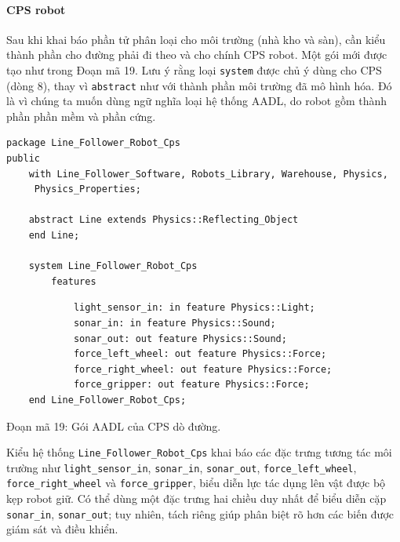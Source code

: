 \paragraph*{CPS robot}
Sau khi khai báo phần tử phân loại cho môi trường (nhà kho và sàn), cần kiểu thành phần cho đường phải đi theo và cho chính CPS robot. Một gói mới được tạo như trong Đoạn mã 19. Lưu ý rằng loại \texttt{system} được chủ ý dùng cho CPS (dòng 8), thay vì \texttt{abstract} như với thành phần môi trường đã mô hình hóa. Đó là vì chúng ta muốn dùng ngữ nghĩa loại hệ thống AADL, do robot gồm thành phần phần mềm và phần cứng.
\begin{verbatim}
package Line_Follower_Robot_Cps
public
    with Line_Follower_Software, Robots_Library, Warehouse, Physics,
     Physics_Properties;

    abstract Line extends Physics::Reflecting_Object
    end Line;

    system Line_Follower_Robot_Cps
        features
\end{verbatim}

\begin{verbatim}
            light_sensor_in: in feature Physics::Light;
            sonar_in: in feature Physics::Sound;
            sonar_out: out feature Physics::Sound;
            force_left_wheel: out feature Physics::Force;
            force_right_wheel: out feature Physics::Force;
            force_gripper: out feature Physics::Force;
    end Line_Follower_Robot_Cps;
\end{verbatim}
\begin{center}\small Đoạn mã 19: Gói AADL của CPS dò đường.\end{center}

Kiểu hệ thống \texttt{Line\_Follower\_Robot\_Cps} khai báo các đặc trưng tương tác môi trường như \texttt{light\_sensor\_in}, \texttt{sonar\_in}, \texttt{sonar\_out}, \texttt{force\_left\_wheel}, \texttt{force\_right\_wheel} và \texttt{force\_gripper}, biểu diễn lực tác dụng lên vật được bộ kẹp robot giữ. Có thể dùng một đặc trưng hai chiều duy nhất để biểu diễn cặp \texttt{sonar\_in}, \texttt{sonar\_out}; tuy nhiên, tách riêng giúp phân biệt rõ hơn các biến được giám sát và điều khiển.

